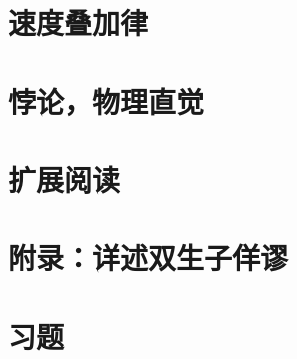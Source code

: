 \section{速度叠加律}
\label{sec1.10}

\section{悖论，物理直觉}
\label{sec1.11}

\section{扩展阅读}
\label{sec1.12}

\section{附录：详述双生子佯谬}
\label{sec1.13}

\section{习题}
\label{sec1.14}